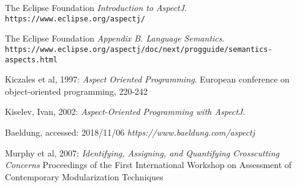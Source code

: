 \documentclass[sigconf]{acmart}
\begin{document}
\begin{thebibliography}{9}
The Eclipse Foundation
\textit{Introduction to AspectJ}. 
\\\texttt{https://www.eclipse.org/aspectj/}

The Eclipse Foundation
\textit{Appendix B. Language Semantics}. 
\\\texttt{https://www.eclipse.org/aspectj/doc/next/progguide/semantics-aspects.html}

Kiczales et al, 1997: 
\textit{Aspect Oriented Programming}. 
European conference on object-oriented programming, 220-242

Kiselev, Ivan, 2002: 
\textit{Aspect-Oriented Programming with AspectJ}. 

Baeldung, accessed: 2018/11/06
\textit{https://www.baeldung.com/aspectj}

Murphy et al, 2007: 
\textit{Identifying, Assigning, and Quantifying Crosscutting Concerns}
Proceedings of the First International Workshop on Assessment of Contemporary Modularization Techniques
\end{thebibliography}
\end{document}
